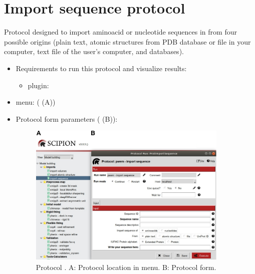 \section{Import sequence protocol}
\label{app:importSequence}%
Protocol designed to import aminoacid or nucleotide sequences in \scipion from four possible origins (plain text, atomic structures from PDB database or file in your computer, text file of the user's computer, and  databases).

\begin{itemize}
  \item Requirements to run this protocol and visualize results:
    \begin{itemize}
        \item \scipion plugin: 
    \end{itemize}
  \item \scipion menu:
   ( (A))
  
  \item Protocol form parameters ( (B)):
  
  \begin{figure}[H]
    \centering 
    \captionsetup{width=.7\linewidth} 
    \includegraphics[width=0.90\textwidth]{Images_appendix/Fig104.pdf}
    \caption{Protocol . A: Protocol location in \scipion menu. B: Protocol form.}
    \label{fig:app_protocol_sequence_1}
   \end{figure}
  

\end{itemize}
